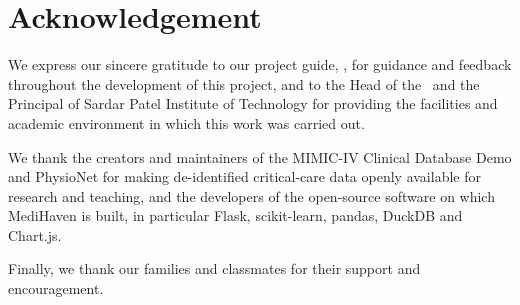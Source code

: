 \clearpage
\chapter*{Acknowledgement}
We express our sincere gratitude to our project guide, \GuideName, for guidance and feedback
throughout the development of this project, and to the Head of the \Department\ and the Principal of
Sardar Patel Institute of Technology for providing the facilities and academic environment in which this
work was carried out.

We thank the creators and maintainers of the MIMIC-IV Clinical Database Demo and PhysioNet for making
de-identified critical-care data openly available for research and teaching, and the developers of the
open-source software on which MediHaven is built, in particular Flask, scikit-learn, pandas, DuckDB and
Chart.js.

Finally, we thank our families and classmates for their support and encouragement.

\vspace{1.2cm}
\noindent\StudentA\hfill\StudentB\hfill\StudentC
